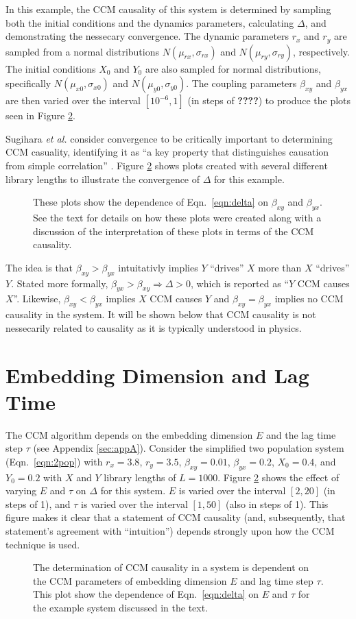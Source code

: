 \documentclass[a4paper,11pt]{article}
\begin{document}
In this example, the CCM causality of this system is determined by sampling both the initial conditions and the dynamics parameters, calculating $\Delta$, and demonstrating the nessecary convergence.  The dynamic parameters $r_x$ and $r_y$ are sampled from a normal distributions $N\left(\mu_{rx},\sigma_{rx}\right)$ and $N\left(\mu_{ry},\sigma_{ry}\right)$, respectively.  The initial conditions $X_0$ and $Y_0$ are also sampled for normal distributions, specifically $N\left(\mu_{x0},\sigma_{x0}\right)$ and $N\left(\mu_{y0},\sigma_{y0}\right)$.  The coupling parameters $\beta_{xy}$ and $\beta_{yx}$ are then varied over the interval $[10^{-6},1]$ (in steps of {\bf ????}) to produce the plots seen in Figure \ref{fig:}.

Sugihara {\em et al. }consider convergence to be critically important to determining CCM casuality, identifying it as ``a key property that distinguishes causation from simple correlation'' \cite{mainref}.  Figure \ref{fig:} shows plots created with several different library lengths to illustrate the convergence of $\Delta$ for this example.
\begin{figure}[ht]
\label{fig:}
\caption{These plots show the dependence of Eqn.\ \ref{eqn:delta} on $\beta_{xy}$ and $\beta_{yx}$.  See the text for details on how these plots were created along with a discussion of the interpretation of these plots in terms of the CCM causality.}
\end{figure}
The idea is that $\beta_{xy}>\beta_{yx}$ intuitativly implies $Y$ ``drives'' $X$ more than $X$ ``drives'' $Y$.  Stated more formally, $\beta_{yx}>\beta_{xy}\Rightarrow\Delta>0$, which is reported as ``$Y$ CCM causes $X$''.  Likewise, $\beta_{xy}<\beta_{yx}$ implies $X$ CCM causes $Y$ and $\beta_{xy}=\beta_{yx}$ implies no CCM causality in the system.  It will be shown below that CCM causality is not nessecarily related to causality as it is typically understood in physics.

\section{Embedding Dimension and Lag Time}
The CCM algorithm depends on the embedding dimension $E$ and the lag time step $\tau$ (see Appendix \ref{sec:appA}).  Consider the simplified two population system (Eqn.\ \ref{eqn:2pop}) with $r_x=3.8$, $r_y=3.5$, $\beta_{xy}=0.01$, $\beta_{yx}=0.2$, $X_0=0.4$, and $Y_0=0.2$ with $X$ and $Y$ library lengths of $L=1000$.  Figure \ref{fig:} shows the effect of varying $E$ and $\tau$ on $\Delta$ for this system.  $E$ is varied over the interval $[2,20]$ (in steps of 1), and $\tau$ is varied over the interval $[1,50]$ (also in steps of 1).  This figure makes it clear that a statement of CCM causality (and, subsequently, that statement's agreement with ``intuition'') depends strongly upon how the CCM technique is used.
\begin{figure}[ht]
\label{fig:}
\caption{The determination of CCM causality in a system is dependent on the CCM parameters of embedding dimension $E$ and lag time step $\tau$.  This plot show the dependence of Eqn.\ \ref{eqn:delta} on $E$ and $\tau$ for the example system discussed in the text.}
\end{figure}
\end{document}
